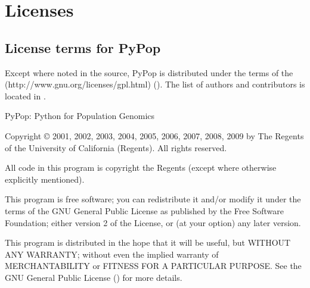 \documentclass[letterpaper,10pt,english,openany,oneside]{sphinxmanual}
\begin{document}
\sphinxstepscope


\chapter{Licenses}
\label{\detokenize{docs/licenses:licenses}}\label{\detokenize{docs/licenses:license}}\label{\detokenize{docs/licenses::doc}}
\begingroup
\footnotesize
\sphinxsetup{%
}


\section{License terms for PyPop}
\label{\detokenize{docs/licenses:license-terms-for-pypop}}
\sphinxAtStartPar
Except where noted in the source, PyPop is distributed under the terms
of the  (http://www.gnu.org/licenses/gpl.html) ({\hyperref[\detokenize{docs/licenses:gpl}]{}}). The list of authors and
contributors is located in {\hyperref[\detokenize{docs/guide-chapter-changes:guide-preface-authors}]{}}.

\sphinxAtStartPar
PyPop: Python for Population Genomics

\sphinxAtStartPar
Copyright © 2001, 2002, 2003, 2004, 2005, 2006, 2007, 2008, 2009 by The
Regents of the University of California (Regents). All rights reserved.

\sphinxAtStartPar
All code in this program is copyright the Regents (except where
otherwise explicitly mentioned).

\sphinxAtStartPar
This program is free software; you can redistribute it and/or modify it
under the terms of the GNU General Public License as published by the
Free Software Foundation; either version 2 of the License, or (at your
option) any later version.

\sphinxAtStartPar
This program is distributed in the hope that it will be useful, but
WITHOUT ANY WARRANTY; without even the implied warranty of
MERCHANTABILITY or FITNESS FOR A PARTICULAR PURPOSE. See the GNU General
Public License ({\hyperref[\detokenize{docs/licenses:gpl}]{}}) for more details.
\end{document}
